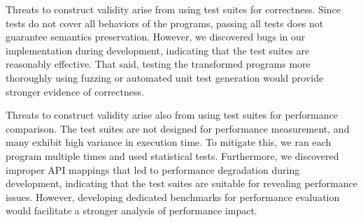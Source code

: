 Threats to construct validity arise from using test suites for correctness.
%
Since tests do not cover all behaviors of the programs, passing all tests does
not guarantee semantics preservation.
%
However, we discovered bugs in our implementation during development, indicating
that the test suites are reasonably effective.
%
That said, testing the transformed programs more thoroughly using fuzzing or
automated unit test generation would provide stronger evidence of correctness.

Threats to construct validity arise also from using test suites for performance
comparison.
%
The test suites are not designed for performance measurement, and many exhibit
high variance in execution time.
%
To mitigate this, we ran each program multiple times and used statistical tests.
%
Furthermore, we discovered improper API mappings that led to performance
degradation during development, indicating that the test suites are suitable for
revealing performance issues.
%
However, developing dedicated benchmarks for performance evaluation would
facilitate a stronger analysis of performance impact.
